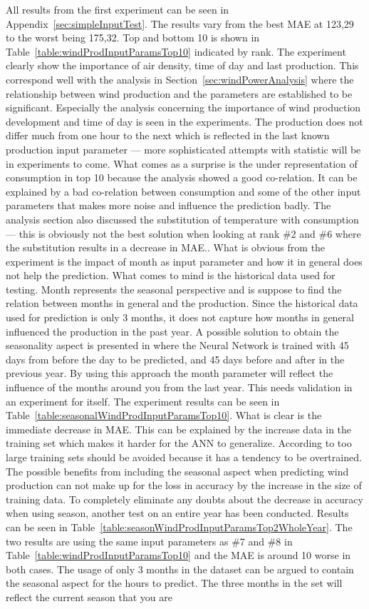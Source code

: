 All results from the first experiment can be seen in Appendix~\ref{sec:simpleInputTest}. The results vary from the best MAE at 123,29 to the worst being 175,32. Top and bottom 10 is shown in Table~\ref{table:windProdInputParamsTop10} indicated by rank. The experiment clearly show the importance of air density, time of day and last production. This correspond well with the analysis in Section~\ref{sec:windPowerAnalysis} where the relationship between wind production and the parameters are established to be significant. Especially the analysis concerning the importance of wind production development and time of day is  seen in the experiments. The production does not differ much from one hour to the next which is reflected in the last known production input parameter --- more sophisticated attempts with statistic will be in experiments to come. What comes as a surprise is the under representation of consumption in top 10 because the analysis showed a good co-relation. It can be explained by a bad co-relation between consumption and some of the other input parameters that makes more noise and influence the prediction badly. The analysis section also discussed the substitution of temperature with consumption --- this is obviously not the best solution when looking at rank \#2 and \#6 where the substitution results in a decrease in MAE.. What is obvious from the experiment is the impact of month as input parameter and how it in general does not help the prediction. What comes to mind is the historical data used for testing. Month represents the seasonal perspective and is suppose to find the relation between months in general and the production. Since the historical data used for prediction is only 3 months, it does not capture how months in general influenced the production in the past year. A possible solution to obtain the seasonality aspect is presented in\cite{pjmForecast} where the Neural Network is trained with 45 days from before the day to be predicted, and 45 days before and after in the previous year. By using this approach the month parameter will reflect the influence of the months around you from the last year. This needs validation in an experiment for itself. The experiment results can be seen in Table~\ref{table:seasonalWindProdInputParamsTop10}. What is clear is the immediate decrease in MAE. This can be explained by the increase data in the training set which makes it harder for the ANN to generalize. According to\cite{1} too large training sets should be avoided because it has a tendency to be overtrained. The possible benefits from including the seasonal aspect when predicting wind production can not make up for the loss in accuracy by the increase in the size of training data. To completely eliminate any doubts about the decrease in accuracy when using season, another test on an entire year has been conducted. Results can be seen in Table~\ref{table:seasonWindProdInputParamsTop2WholeYear}. The two results are using the same input parameters as \#7 and \#8 in Table~\ref{table:windProdInputParamsTop10} and the MAE is around 10 worse in both cases. The usage of only 3 months in the dataset can be argued to contain the seasonal aspect for the hours to predict. The three months in the set will reflect the current season that you are 